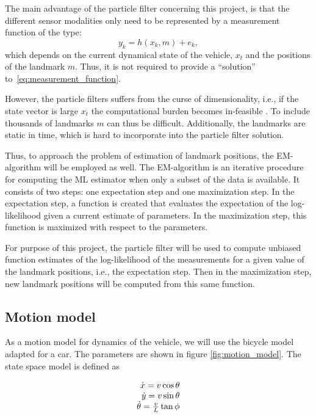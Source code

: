 The main advantage of the particle filter concerning this project, is that the
different sensor modalities only need to be represented by a measurement function
of the type:
\begin{equation}
  \label{eq:measurement_function}
  y_k = h(x_k, m) + e_k,
\end{equation}
which depends on the current dynamical state of the vehicle, $x_t$ and
the positions of the landmark $m$. Thus, it is not required to provide
a ``solution'' to~\eqref{eq:measurement_function}.

However, the particle filters suffers from the curse of
dimensionality, i.e., if the state vector is large $x_t$ the
computational burden becomes in-feasible \cite{1453762}. To include
thousands of landmarks $m$ can thus be difficult. Additionally, the
landmarks are static in time, which is hard to incorporate into the
particle filter solution.

Thus, to approach the problem of estimation of landmark positions, the
\gls{EM}-algorithm \cite{Dempster77maximumlikelihood} will be employed
as well. The \gls{EM}-algorithm is an iterative procedure for computing
the \gls{ML} estimator when only a subset of the data is available. It
consists of two steps: one expectation step and one maximization
step. In the expectation step, a function is created that evaluates
the expectation of the log-likelihood given a current estimate of
parameters. In the maximization step, this function is maximized with
respect to the parameters.

For purpose of this project, the particle filter will be used to compute
unbiased function estimates of the log-likelihood of the measurements for a
given value of the landmark positions, i.e., the expectation step.  Then in the maximization step,
new landmark positions will be computed from this same function.

\subsection{Motion model}

As a motion model for dynamics of the vehicle, we will use the bicycle model
adapted for a
car.
The parameters are shown in figure \ref{fig:motion_model}. The state space
model is defined as

\begin{equation}
 \begin{array}[b]{r}
  \dot{x}  = v \cos \theta \\
  \dot{y}  = v \sin \theta \\
  \dot{\theta}  = \frac{v}{L} \tan{\phi}
 \end{array}
\end{equation}

